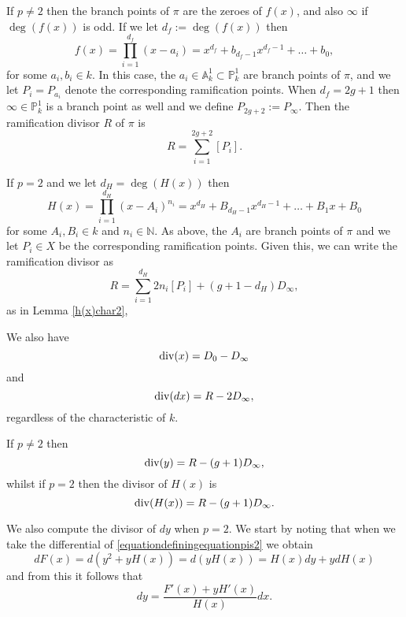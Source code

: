 If $p \neq 2$ then the branch points of $\pi$ are the zeroes of $f(x)$, and also $\infty$ if $\deg(f(x))$ is odd.
If we let $d_f:=\deg(f(x))$ then 
    \begin{equation}\label{equationexpansionoff(x)}
    f(x) = \prod_{i=1}^{d_f} (x-a_i) = x^{d_f} + b_{d_f - 1}x^{d_f-1} + \ldots + b_0,
    \end{equation}
for some $a_i, b_i \in k$.
In this case, the $a_i \in \mathbb A_k^1 \subset \mathbb P_k^1$ are branch points of $\pi$, and we let $P_i = P_{a_i}$ denote the corresponding ramification points.
When $d_f = 2g+1$ then $\infty \in \mathbb P_k^1$ is a branch point as well and we define $P_{2g+2} := P_\infty$.
Then the ramification divisor $R$ of $\pi$ is
    \[
    R = \sum_{i=1}^{2g+2} [P_i] .
    \]

If $p=2$ and we let $d_H = \deg(H(x))$ then
    \begin{equation}\label{equationcapitalh}
    H(x) = \prod_{i=1}^{d_H} (x-A_i)^{n_i} = x^{d_H} + B_{{d_H}-1}x^{{d_H}-1} + \ldots + B_1x + B_0
    \end{equation}
for some $A_i, B_i \in  k$ and $n_i \in \mathbb N$.
As above, the $A_i$ are branch points of $\pi$ and we let $P_i \in X$ be the corresponding ramification points.
Given this, we can write the ramification divisor as
    \[
    R = \sum_{i=1}^{d_H} 2n_i[P_i] + (g+1-{d_H})D_\infty,
    \]
as in Lemma \ref{h(x)char2}, 

We also have
    \begin{equation}\label{equationdivxpis2}
    \operatorname{div} (x)  = D_0 - D_\infty
    \end{equation}
and
    \begin{equation}\label{equationdifferentialdivisor}
    \operatorname{div}(dx) = R - 2D_\infty,
    \end{equation}
regardless of the characteristic of $k$.

If $p \neq 2$ then 
    \begin{equation}\label{equationdivisorofypnot2}
    \operatorname{div}(y)  = R - (g+1)D_\infty,
    \end{equation}
whilst if $p=2$ then the divisor of $H(x)$ is
    \begin{equation}\label{equationdivisorofH}
    \operatorname{div} (H(x))  = R - (g+1)D_\infty. 
    \end{equation}



We also compute the divisor of $dy$ when $p=2$.
We start by noting that when we take the differential of \eqref{equationdefiningequationpis2} we obtain
    \[
    dF(x) = d\left(y^2 + yH(x) \right) = d(yH(x)) = H(x)dy + ydH(x)
    \]
and from this it follows that
    \begin{equation}\label{equationdivisorofdypis2}
    dy = \frac{F'(x)+yH'(x)}{H(x)}dx.
    \end{equation}

